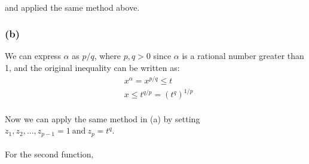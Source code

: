 \paragraph{}
and applied the same method above.
\subsubsection*{(b)}
We can express $\alpha$ as $p/q$, where $p,q>0$ since $\alpha$ is a rational number greater than 1, and the original inequality can be written as:
\begin{align*}
&x^{\alpha} = x^{p/q} \leq t \\
&x \leq t^{q/p} = (t^q)^{1/p}
\end{align*}
\paragraph{}
Now we can apply the same method in (a) by setting $z_1, z_2,...,z_{p-1} = 1\ \text{and}\ z_p =t^q$.
\paragraph{}
For the second function,
